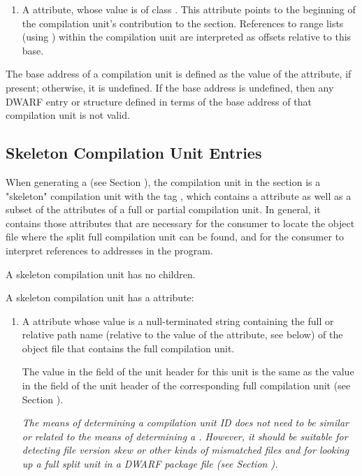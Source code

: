 \begin{enumerate}[1. ]
\item \hypertarget{chap:DWATrangesbaseforrangelists}{}
A \DWATrangesbaseDEFN{}
attribute, whose value is of class \CLASSrangelistptr.
This attribute points to the beginning of the compilation
unit's contribution to the \dotdebugranges{} section.
References to range lists (using \DWFORMsecoffset)
within the compilation unit are
interpreted as offsets relative to this base.

\end{enumerate}

The  base address of a compilation unit is defined as the
value of the \DWATlowpc{} attribute, if present; otherwise,
it is undefined. If the base address is undefined, then any
DWARF entry or structure defined in terms of the base address
of that compilation unit is not valid.

\subsection{Skeleton Compilation Unit Entries}
\label{chap:skeletoncompilationunitentries}
When generating a \splitDWARFobjectfile{} (see 
Section ), the
compilation unit in the \dotdebuginfo{} section is a "skeleton"
compilation unit with the tag 
\DWTAGskeletonunitTARG, which contains a
\DWATdwoname{} attribute as well as a subset of the
attributes of a full or partial compilation unit. In general,
it contains those attributes that are necessary for the consumer
to locate the object file where the split full compilation unit
can be found, and for the consumer to interpret references to
addresses in the program. 


A skeleton compilation unit has no children.

A skeleton compilation unit has a \DWATdwoname{} attribute:

\begin{enumerate}[1. ]

\item {}
A \DWATdwonameDEFN{} attribute
whose value is a
null-terminated string containing the full or relative
path name (relative to the value of the \DWATcompdir{} attribute, 
see below) of the object file that contains the full
compilation unit.

The value in the \HFNdwoid{} field of the unit header for 
this unit is the same as the value in the \HFNdwoid{} field 
of the unit header of the corresponding full compilation 
unit (see Section ).
        
\textit{The means of determining a compilation unit ID does 
not need to be similar or related to the means of 
determining a \TUsignature. However, it should 
be suitable for detecting file version skew or other 
kinds of mismatched files and for looking up a full
split unit in a DWARF package file 
(see Section ).}

\end{enumerate}

